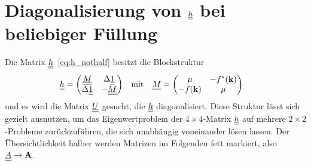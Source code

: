 



\chapter{Diagonalisierung von $\underline{\underline{h}}$ bei beliebiger Füllung}\label{sec:anhang_a}

Die Matrix $\underline{\underline{h}}$~\eqref{eq:h_nothalf} besitzt die Blockstruktur
\begin{align}
    \underline{\underline{h}} &= \begin{pmatrix}
        \underline{\underline{M}} & \Delta \underline{\underline{1}} \\
        \Delta \underline{\underline{1}} & -\underline{\underline{M}}
    \end{pmatrix} & \text{mit} & & \underline{\underline{M}} &= \begin{pmatrix}
        \mu & -f^*(\mathbf{k}) \\
        -f(\mathbf{k}) & \mu
    \end{pmatrix} 
\end{align}
und es wird die Matrix $\underline{\underline{U}}$ gesucht, die $\underline{\underline{h}}$ diagonalisiert.
Diese Struktur lässt sich gezielt ausnutzen, um das Eigenwertproblem der $4\times4$-Matrix $\underline{\underline{h}}$ auf mehrere $2\times2$-Probleme zurückzuführen, die sich unabhängig voneinander lösen lassen. Der Übersichtlichkeit halber werden Matrizen im Folgenden fett markiert, also $\underline{\underline{A}} \rightarrow \mathbf{A}$.

